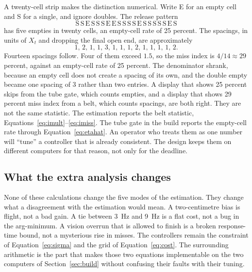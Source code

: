 A twenty-cell strip makes the distinction numerical. Write E for an empty cell and S for a single, and ignore doubles. The release pattern
\[
\mathrm{S\,S\,E\,S\,S\,S\,E\,E\,S\,S\,S\,S\,E\,S\,S\,S\,S\,S\,E\,S}
\]
has five empties in twenty cells, an empty-cell rate of 25 percent. The spacings, in units of $X_t$ and dropping the final open end, are approximately
\[
1,\,2,\,1,\,1,\,3,\,1,\,1,\,1,\,2,\,1,\,1,\,1,\,1,\,2.
\]
Fourteen spacings follow. Four of them exceed $1.5$, so the miss index is $4/14\approx 29$ percent, against an empty-cell rate of 25 percent. The denominator shrank, because an empty cell does not create a spacing of its own, and the double empty became one spacing of 3 rather than two entries. A display that shows 25 percent skips from the tube gate, which counts empties, and a display that shows 29 percent miss index from a belt, which counts spacings, are both right. They are not the same statistic. The estimation reports the belt statistic, Equations~\eqref{eq:imult}--\eqref{eq:imiss}. The tube gate in the build reports the empty-cell rate through Equation~\eqref{eq:etahat}. An operator who treats them as one number will ``tune'' a controller that is already consistent. The design keeps them on different computers for that reason, not only for the deadline.

\subsection{What the extra analysis changes}

None of these calculations change the five modes of the estimation. They change what a disagreement with the estimation would mean. A two-centimetre bias is flight, not a bad gain. A tie between 3~Hz and 9~Hz is a flat cost, not a bug in the arg-minimum. A vision overrun that is allowed to finish is a broken response-time bound, not a mysterious rise in misses. The controllers remain the constraint of Equation~\eqref{eq:sigma} and the grid of Equation~\eqref{eq:cost}. The surrounding arithmetic is the part that makes those two equations implementable on the two computers of Section~\ref{sec:build} without confusing their faults with their tuning.

